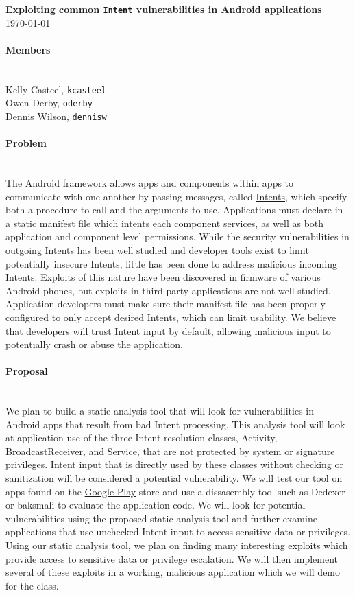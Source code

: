 \documentclass[12pt,a4paper,draft]{article}
\begin{document}


\flushleft\textbf{Exploiting common \texttt{Intent} vulnerabilities in Android %
applications}\\
\today\\

\paragraph{Members} ~\\

Kelly Casteel, \texttt{kcasteel}\\
Owen Derby, \texttt{oderby}\\
Dennis Wilson, \texttt{dennisw}\\

\paragraph{Problem} ~\\
The Android framework allows apps and components within apps to communicate with
one another by passing messages, called
\href{https://developer.android.com/reference/android/content/Intent.html}{Intents},
which specify both a procedure to call and the arguments to use. Applications
must declare in a static manifest file which intents each component services, as
well as both application and component level permissions. While the security
vulnerabilities in outgoing Intents has been well studied
\cite{chin_analyzing_2011} and developer tools exist to limit potentially
insecure Intents, little has been done to address malicious incoming
Intents. Exploits of this nature have been discovered in firmware of various
Android phones\cite{grace_systematic_2012}, but exploits in third-party
applications are not well studied. Application developers must make sure their
manifest file has been properly configured to only accept desired Intents, which
can limit usability. We believe that developers will trust Intent input by
default, allowing malicious input to potentially crash or abuse the application.

\paragraph{Proposal} ~\\
We plan to build a static analysis tool that will look for vulnerabilities in
Android apps that result from bad Intent processing. This analysis tool will
look at application use of the three Intent resolution classes, Activity,
BroadcastReceiver, and Service, that are not protected by system or signature
privileges. Intent input that is directly used by these classes without checking
or sanitization will be considered a potential vulnerability. We will test our
tool on apps found on the \href{https://play.google.com/store/apps}{Google Play}
store and use a dissasembly tool such as Dedexer\cite{dedexer} or
baksmali\cite{baksmali} to evaluate the application code. We will look for
potential vulnerabilities using the proposed static analysis tool and further
examine applications that use unchecked Intent input to access sensitive data or
privileges.\\

Using our static analysis tool, we plan on finding many interesting exploits
which provide access to sensitive data or privilege escalation. We will then
implement several of these exploits in a working, malicious application which we
will demo for the class.


\end{document}
